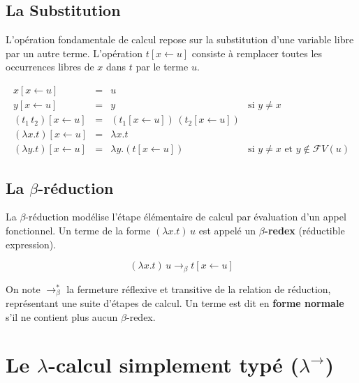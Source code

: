 \documentclass{article}
\begin{document}
\subsection{La Substitution}

L'opération fondamentale de calcul repose sur la substitution d'une variable libre par un autre terme. L'opération $t[x \leftarrow u]$ consiste à remplacer toutes les occurrences libres de $x$ dans $t$ par le terme $u$.

\[
\begin{array}{lcll}
x[x \leftarrow u] & = & u & \\
y[x \leftarrow u] & = & y & \text{si } y \neq x \\
(t_1\,t_2)[x \leftarrow u] & = & (t_1[x \leftarrow u])\,(t_2[x \leftarrow u]) & \\
(\lambda x. t)[x \leftarrow u] & = & \lambda x. t & \\
(\lambda y. t)[x \leftarrow u] & = & \lambda y. (t[x \leftarrow u]) & \text{si } y \neq x \text{ et } y \notin \mathcal{F}V(u)
\end{array}
\]


\subsection{La \texorpdfstring{$\beta$}{beta}-réduction}

La $\beta$-réduction modélise l'étape élémentaire de calcul par évaluation d'un appel fonctionnel. Un terme de la forme $(\lambda x. t)\,u$ est appelé un \textbf{$\beta$-redex} (réductible expression).

\[ (\lambda x. t)\,u \longrightarrow_{\beta} t[x \leftarrow u] \]

On note $\longrightarrow_{\beta}^*$ la fermeture réflexive et transitive de la relation de réduction, représentant une suite d'étapes de calcul. Un terme est dit en \textbf{forme normale} s'il ne contient plus aucun $\beta$-redex.

\section{Le \texorpdfstring{$\lambda$}{lambda}-calcul simplement typé (\texorpdfstring{$\lambda^{\to}$}{lambda ->})}
\end{document}
